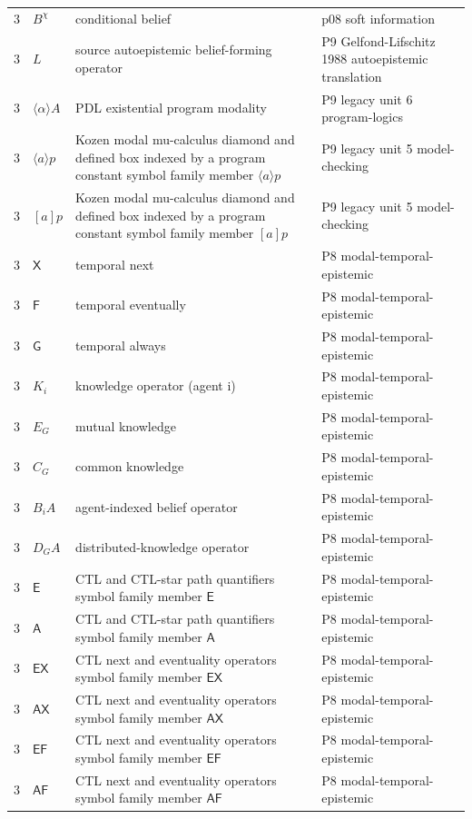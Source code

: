 \begin{longtable}{@{}p{}p{}p{}p{}@{}}
3 & \(B^\chi\) & conditional belief & p08 soft information \\
3 & \(L\) & source autoepistemic belief-forming operator & P9 Gelfond-Lifschitz 1988 autoepistemic translation \\
3 & \(\langle\alpha\rangle A\) & PDL existential program modality & P9 legacy unit 6 program-logics \\
3 & \(\langle a\rangle p\) & Kozen modal mu-calculus diamond and defined box indexed by a program constant symbol family member \(\langle a\rangle p\) & P9 legacy unit 5 model-checking \\
3 & \([a]p\) & Kozen modal mu-calculus diamond and defined box indexed by a program constant symbol family member \([a]p\) & P9 legacy unit 5 model-checking \\
3 & \(\mathsf X\) & temporal next & P8 modal-temporal-epistemic \\
3 & \(\mathsf F\) & temporal eventually & P8 modal-temporal-epistemic \\
3 & \(\mathsf G\) & temporal always & P8 modal-temporal-epistemic \\
3 & \(K_i\) & knowledge operator (agent i) & P8 modal-temporal-epistemic \\
3 & \(E_G\) & mutual knowledge & P8 modal-temporal-epistemic \\
3 & \(C_G\) & common knowledge & P8 modal-temporal-epistemic \\
3 & \(B_iA\) & agent-indexed belief operator & P8 modal-temporal-epistemic \\
3 & \(D_GA\) & distributed-knowledge operator & P8 modal-temporal-epistemic \\
3 & \(\mathsf E\) & CTL and CTL-star path quantifiers symbol family member \(\mathsf E\) & P8 modal-temporal-epistemic \\
3 & \(\mathsf A\) & CTL and CTL-star path quantifiers symbol family member \(\mathsf A\) & P8 modal-temporal-epistemic \\
3 & \(\mathsf{EX}\) & CTL next and eventuality operators symbol family member \(\mathsf{EX}\) & P8 modal-temporal-epistemic \\
3 & \(\mathsf{AX}\) & CTL next and eventuality operators symbol family member \(\mathsf{AX}\) & P8 modal-temporal-epistemic \\
3 & \(\mathsf{EF}\) & CTL next and eventuality operators symbol family member \(\mathsf{EF}\) & P8 modal-temporal-epistemic \\
3 & \(\mathsf{AF}\) & CTL next and eventuality operators symbol family member \(\mathsf{AF}\) & P8 modal-temporal-epistemic \\

\end{longtable}
